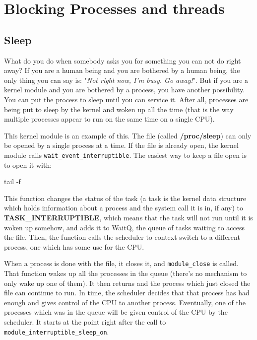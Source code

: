 \documentclass[10pt, oneside]{book}
\begin{document}

\section{Blocking Processes and threads}
\label{sec:blocking_process_thread}
\subsection{Sleep}
\label{sec:sleep}
What do you do when somebody asks you for something you can not do right away?
If you are a human being and you are bothered by a human being, the only thing you can say is: "\emph{Not right now, I'm busy. Go away!}".
But if you are a kernel module and you are bothered by a process, you have another possibility.
You can put the process to sleep until you can service it.
After all, processes are being put to sleep by the kernel and woken up all the time (that is the way multiple processes appear to run on the same time on a single CPU).

This kernel module is an example of this.
The file (called \textbf{/proc/sleep}) can only be opened by a single process at a time.
If the file is already open, the kernel module calls \verb|wait_event_interruptible|.
The easiest way to keep a file open is to open it with:

\begin{codebash}
tail -f
\end{codebash}

This function changes the status of the task (a task is the kernel data structure which holds information about a process and the system call it is in,
if any) to \textbf{TASK\_INTERRUPTIBLE}, which means that the task will not run until it is woken up somehow, and adds it to WaitQ, the queue of tasks waiting to access the file.
Then, the function calls the scheduler to context switch to a different process, one which has some use for the CPU.

When a process is done with the file, it closes it, and \verb|module_close| is called.
That function wakes up all the processes in the queue (there's no mechanism to only wake up one of them).
It then returns and the process which just closed the file can continue to run.
In time, the scheduler decides that that process has had enough and gives control of the CPU to another process.
Eventually, one of the processes which was in the queue will be given control of the CPU by the scheduler.
It starts at the point right after the call to \verb|module_interruptible_sleep_on|.
\end{document}
